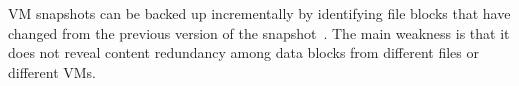 VM snapshots can be  backed up  incrementally by identifying file  blocks that have
changed from the previous version of the snapshot~\cite{Clements2009,Vrable2009,TanIPDPS2011}.
The main weakness
is that it does not reveal content redundancy among data blocks from different files or
different VMs.
 

